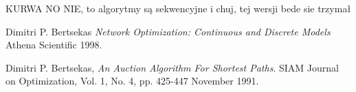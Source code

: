\documentclass {article}
\begin{document}
KURWA NO NIE, to algorytmy są sekwencyjne i chuj, tej wersji bede sie trzymał

\begin{thebibliography}{9}

        Dimitri P. Bertsekas
        \emph{Network Optimization: Continuous and Discrete Models}
        Athena Scientific
        1998.

        Dimitri P. Bertsekas,
        \emph{An Auction Algorithm For Shortest Paths}.
        SIAM Journal on Optimization,
        Vol. 1, No. 4, pp. 425-447
        November 1991.
      
\end{thebibliography}
\end{document}

